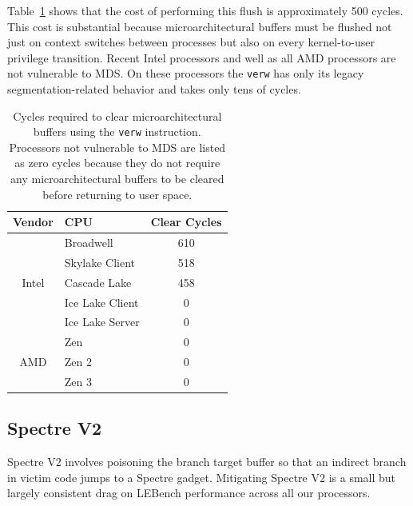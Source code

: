 Table~\ref{table:verw} shows that the cost of performing this flush is approximately 500 cycles.
This cost is substantial because microarchitectural buffers must be flushed not
just on context switches between processes but also on every kernel-to-user privilege transition.
Recent Intel processors and well as all AMD processors are not vulnerable to MDS.
On these processors the \texttt{verw} has only its legacy segmentation-related behavior and takes only tens of cycles.

\begin{table}[h]
  \begin{center}
  \begin{tabular}{clc}
      \textbf{Vendor} & \textbf{CPU} & \textbf{Clear Cycles} \\ \hline 
      \multirow{5}{*}{Intel} & Broadwell             & 610 \\
                             & Skylake Client        & 518 \\
                             & Cascade Lake          & 458 \\
                             & Ice Lake Client       & 0 \\
                             & Ice Lake Server       & 0 \\ \hline
      \multirow{3}{*}{AMD}   & Zen                   & 0 \\
                             & Zen 2                 & 0 \\
                             & Zen 3                 & 0 \\ \hline
  \end{tabular}
  \end{center}
  \caption{Cycles required to clear microarchitectural buffers using the
    \texttt{verw} instruction. Processors not vulnerable to MDS are listed as
    zero cycles because they do not require any microarchitectural buffers to be cleared before returning to user space. }
  \label{table:verw}
\end{table}

\subsection{Spectre V2}

Spectre V2 involves poisoning the branch target buffer so that an indirect branch in victim code jumps to a Spectre gadget.
Mitigating Spectre V2 is a small but largely consistent drag on LEBench performance across all our processors.

